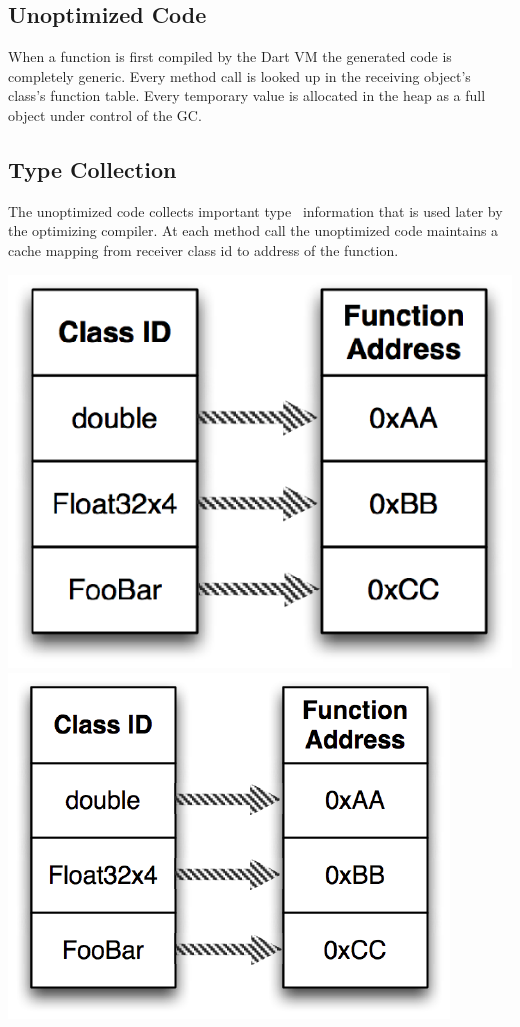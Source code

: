 \documentclass[preprint]{sigplanconf}
\begin{document}
\subsection{Unoptimized Code}
When a function is first compiled by the Dart VM the generated code is completely generic. Every method call is looked up in the receiving object's class's function table. Every temporary value is allocated in the heap as a full object under control of the GC. 

\subsection{Type Collection}
The unoptimized code collects important type~\cite{typefeedback} information that is used later by the optimizing compiler. At each method call the unoptimized code maintains a cache mapping from receiver class id to address of the function. 

\ifx\pdfoutput\undefined
\includegraphics{figures/typecache.eps}
\else
\includegraphics{figures/typecache-eps-converted-to.pdf}
\fi
\end{document}
